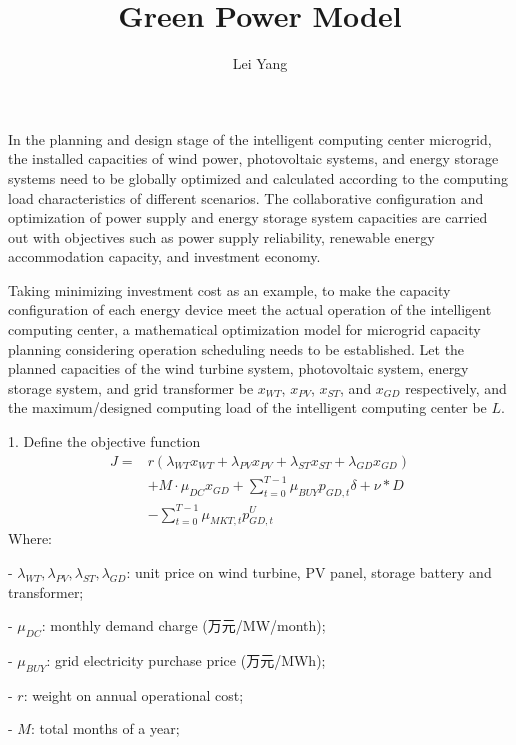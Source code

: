 \documentclass{article}
\title{Green Power Model}
\author{Lei Yang }
\begin{document}
\maketitle



    




In the planning and design stage of the intelligent computing center microgrid, the installed capacities of wind power, photovoltaic systems, and energy storage systems need to be globally optimized and calculated according to the computing load characteristics of different scenarios. The collaborative configuration and optimization of power supply and energy storage system capacities are carried out with objectives such as power supply reliability, renewable energy accommodation capacity, and investment economy.

Taking minimizing investment cost as an example, to make the capacity configuration of each energy device meet the actual operation of the intelligent computing center, a mathematical optimization model for microgrid capacity planning considering operation scheduling needs to be established. Let the planned capacities of the wind turbine system, photovoltaic system, energy storage system, and grid transformer be \(x_{WT}\), \(x_{PV}\), \(x_{ST}\), and \(x_{GD}\) respectively, and the maximum/designed computing load of the intelligent computing center be \(L\).

1. Define the objective function
\begin{align}
J = & r\left(\lambda_{WT} x_{WT} + \lambda_{PV} x_{PV} + \lambda_{ST} x_{ST} +\lambda_{GD} x_{GD}\right) \\ \nonumber
& + M \cdot \mu_{DC} x_{GD} + \sum_{t=0}^{T-1} \mu_{BUY} p_{GD,t} \delta + \nu * D \\ \nonumber 
& -\sum_{t=0}^{T-1}\mu_{MKT,t}p_{GD,t}^{U} 
\end{align}
Where:

\noindent - $\lambda_{WT},\lambda_{PV},\lambda_{ST},\lambda_{GD}$: unit price on wind turbine, PV panel, storage battery and transformer; 

\noindent - $\mu_{DC}$: monthly demand charge (万元/MW/month);

\noindent - $\mu_{BUY}$: grid electricity purchase price (万元/MWh);

\noindent - $r$: weight on annual operational cost;

\noindent - $M$: total months of a year;
\end{document}

